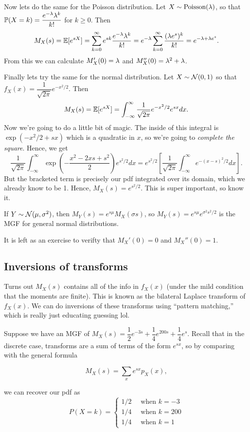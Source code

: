\documentclass[11 pt]{scrartcl}
\begin{document}
\begin{example}
    Now lets do the same for the Poisson distribution. Let $X\sim \text{Poisson}(\lambda)$, so that $\mathbb P(X=k) = \dfrac{e^{-\lambda}\lambda^k}{k!}$ for $k\geq 0$. Then 
    \[ M_X(s) = \mathbb E[e^{sX}] = \sum_{k = 0}^\infty e^{sk}\dfrac{e^{-\lambda}\lambda^k}{k!} = e^{-\lambda}\sum_{k=0}^\infty \dfrac{(\lambda e^s)^k}{k!} = e^{-\lambda+\lambda e^s}.\]
    From this we can calculate $M_X'(0) = \lambda$ and $M_X''(0) = \lambda^2+\lambda$. 
\end{example}

\begin{example}
    Finally lets try the same for the normal distribution. Let $X\sim \mathcal{N}(0,1)$ so that $f_X(x) = \dfrac{1}{\sqrt{2\pi}}e^{-x^2/2}$. Then 
    \[ M_X(s) = \mathbb E[e^{sX}] = \int_{-\infty}^\infty\dfrac{1}{\sqrt{2\pi}}e^{-x^2/2}e^{sx}dx.\]
    Now we're going to do a little bit of magic. The inside of this integral is $\exp(-x^2/2 + sx)$ which is a quadratic in $x$, so we're going to \emph{complete the square}. Hence, we get 
    \[ \dfrac{1}{\sqrt{2\pi}} \int_{-\infty}^\infty  \exp\left(-\dfrac{x^2-2xs+s^2}{2}\right) e^{s^2/2}dx = e^{s^2/2} \left[ \dfrac{1}{\sqrt{2\pi}} \int_{-\infty}^\infty e^{-(x-s)^2/2}dx\right].\]
    But the bracketed term is precisely our pdf integrated over its domain, which we already know to be 1. Hence, $M_X(s) = e^{s^2/2}$. This is super important, so know it. 

    If $Y\sim \mathcal{N}(\mu, \sigma^2)$, then $M_Y(s) = e^{s\mu}M_X(\sigma s)$, so $M_Y(s) = e^{s\mu}e^{\sigma^2s^2/2}$ is the MGF for general normal distributions. 
    
    It is left as an exercise to verifty that $M_X'(0) = 0$ and $M_X''(0) = 1$. 
\end{example}

\subsection{Inversions of transforms} 
Turns out $M_X(s)$ contains all of the info in $f_X(x)$ (under the mild condition that the moments are finite). This is known as the bilateral Laplace transform of $f_X(x)$. We can do inversions of these transforms using ``pattern matching,'' which is really just educating guessing lol. 

\begin{example}
    Suppose we have an MGF of $M_X(s) = \dfrac{1}{2}e^{-3s} + \dfrac{1}{4}e^{200s} + \dfrac{1}{4}e^s$. Recall that in the discrete case, transforms are a sum of terms of the form $e^{sx}$, so by comparing with the general formula 
  
    \[ M_X(s) = \sum_x e^{sx} p_X(x), \]

    we can recover our pdf as 
    \[ P(X = k) = \begin{cases}  
                    1/2 \quad \text{ when } k = -3 \\ 
                    1/4 \quad \text{ when } k = 200 \\ 
                    1/4 \quad \text{ when } k = 1 
            \end{cases} \] 
\end{example}
\end{document}
